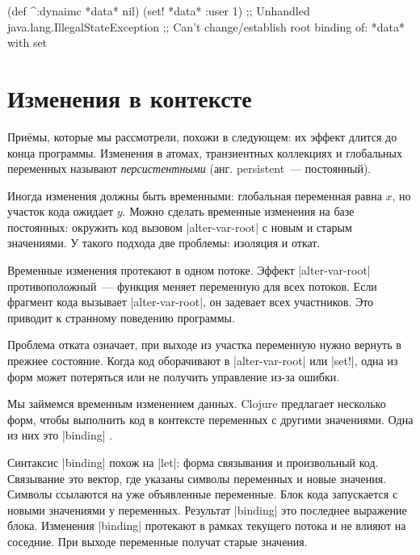 \begin{english}
  \begin{clojure}
(def ^:dynaimc *data* nil)
(set! *data* {:user 1})
;; Unhandled java.lang.IllegalStateException
;; Can't change/establish root binding of: *data* with set
  \end{clojure}
\end{english}

\section{Изменения в контексте}


При\"{е}мы, которые мы рассмотрели, похожи в следующем: их эффект длится до конца
программы. Изменения в атомах, транзиентных коллекциях и глобальных переменных
называют \emph{персистентными} (анг. persistent~--- постоянный).

Иногда изменения должны быть временными: глобальная переменная равна $x$, но
участок кода ожидает $y$. Можно сделать временные изменения на базе постоянных:
окружить код вызовом \spverb|alter-var-root| с новым и старым значениями. У
такого подхода две проблемы: изоляция и откат.


Временные изменения протекают в одном потоке. Эффект \spverb|alter-var-root|
противоположный~--- функция меняет переменную для всех потоков. Если фрагмент
кода вызывает \spverb|alter-var-root|, он задевает всех участников. Это приводит
к странному поведению программы.

Проблема отката означает, при выходе из участка переменную нужно вернуть в
прежнее состояние. Когда код оборачивают в \spverb|alter-var-root| или
\spverb|set!|, одна из форм может потеряться или не получить управление из-за
ошибки.

Мы займемся временным изменением данных. Clojure предлагает несколько форм,
чтобы выполнить код в контексте переменных с другими значениями. Одна из них это
\spverb|binding| .


Синтаксис \spverb|binding| похож на \spverb|let|: форма связывания и
произвольный код. Связывание это вектор, где указаны символы переменных и новые
значения. Символы ссылаются на уже объявленные переменные. Блок кода запускается
с новыми значениями у переменных. Результат \spverb|binding| это последнее
выражение блока. Изменения \spverb|binding| протекают в рамках текущего потока и
не влияют на соседние. При выходе переменные получат старые значения.

